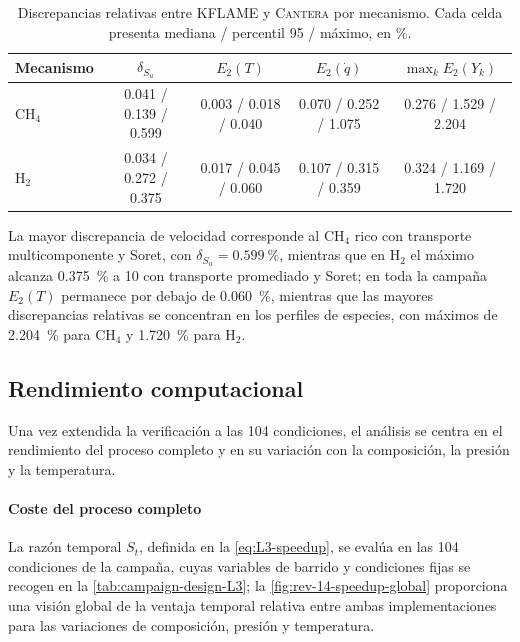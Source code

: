 \documentclass[12pt,a4paper,twoside,openany]{book}
\newcommand{\KFLAME}{\textsc{KFLAME}\xspace}
\newcommand{\Cantera}{\textsc{Cantera}\xspace}
\begin{document}
\begin{table}[!htbp]
\centering
\footnotesize
\caption{Discrepancias relativas entre \KFLAME{} y \Cantera{} por mecanismo.
Cada celda presenta mediana / percentil 95 / máximo, en \si{\percent}.}
\label{tab:concordance-summary}
\begin{tabular}{@{}lcccc@{}}
\toprule
Mecanismo &
\(\delta_{S_u}\) &
\(E_2(T)\) &
\(E_2(\dot q)\) &
\(\max_k E_2(Y_k)\) \\
\midrule

CH$_4$
& 0.041 / 0.139 / 0.599
& 0.003 / 0.018 / 0.040
& 0.070 / 0.252 / 1.075
& 0.276 / 1.529 / 2.204 \\

H$_2$
& 0.034 / 0.272 / 0.375
& 0.017 / 0.045 / 0.060
& 0.107 / 0.315 / 0.359
& 0.324 / 1.169 / 1.720 \\

\bottomrule
\end{tabular}
\end{table}

La mayor discrepancia de velocidad corresponde al CH$_4$ rico con transporte
multicomponente y Soret, con
\(\delta_{S_u}=\SI{0.599}{\percent}\), mientras que en H$_2$ el máximo alcanza
\SI{0.375}{\percent} a \SI{10}{\atmosphere} con transporte promediado y Soret;
en toda la campaña \(E_2(T)\) permanece por debajo de
\SI{0.060}{\percent}, mientras que las mayores discrepancias relativas se
concentran en los perfiles de especies, con máximos de
\SI{2.204}{\percent} para CH$_4$ y \SI{1.720}{\percent} para H$_2$.

\FloatBarrier

\subsection{Rendimiento computacional}
\label{sec:L3-performance}

Una vez extendida la verificación a las 104 condiciones, el análisis se centra
en el rendimiento del proceso completo y en su variación con la composición,
la presión y la temperatura.

\paragraph{Coste del proceso completo}

La razón temporal \(S_t\), definida en la \cref{eq:L3-speedup}, se evalúa en
las 104 condiciones de la campaña, cuyas variables de barrido y condiciones
fijas se recogen en la \cref{tab:campaign-design-L3}; la
\cref{fig:rev-14-speedup-global} proporciona una visión global de la ventaja
temporal relativa entre ambas implementaciones para las variaciones de
composición, presión y temperatura.
\end{document}

